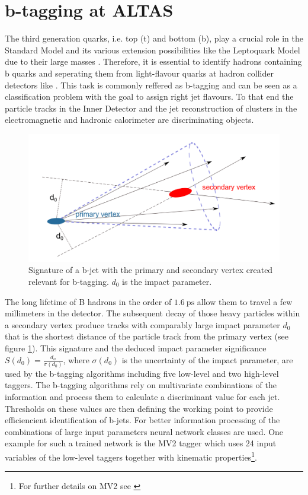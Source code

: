 \section{b-tagging at ALTAS}\label{btagging}
The third generation quarks, i.e. top (t) and bottom (b), play a crucial role in the Standard Model and its various extension possibilities like the Leptoquark Model due to their large masses \cite{Hansson}. Therefore, it is essential to identify hadrons containing b quarks and seperating them from light-flavour quarks at hadron collider detectors like {\ATLAS}. This task is commonly reffered as b-tagging and can be seen as a classification problem with the goal to assign right jet flavours. To that end the particle tracks in the Inner Detector and the jet reconstruction of clusters in the electromagnetic and hadronic calorimeter are discriminating objects. \cite{Paganini}\par
%
\begin{figure}[htbp]                                 
 \begin{center}                                       
  \includegraphics[width=0.55\linewidth]{figures/btagged.pdf} 
   \caption[Tracks in a b-jet.]{Signature of a b-jet with the primary and secondary vertex created relevant for b-tagging. $d_0$ is the impact parameter. \cite{Hansson}}
  \label{btagged}                                    
 \end{center}
\end{figure}
%
The long lifetime of B hadrons in the order of $\SI{1.6}{\pico\second}$ allow them to travel a few millimeters in the detector. The subsequent decay of those heavy particles within a secondary vertex produce tracks with comparably large impact parameter $d_0$ that is the shortest distance of the particle track from the primary vertex (see figure \ref{btagged}). This signature and the deduced impact parameter significance $S(d_0)=\frac{d_o}{\sigma(d_0)}$, where $\sigma(d_0)$ is the uncertainty of the impact parameter, are used by the b-tagging algorithms including five low-level and two high-level taggers. \cite{Hansson} The b-tagging algorithms rely on multivariate combinations of the information and process them to calculate a discriminant value for each jet. Thresholds on these values are then defining the working point to provide efficiencient identification of b-jets. For better information processing of the combinations of large input parameters neural network classes are used. \cite{Luca} One example for such a trained network is the MV2 tagger which uses 24 input variables of the low-level taggers together with kinematic properties\footnote{For further details on MV2 see \cite{MV2}}. \cite{Paganini}
